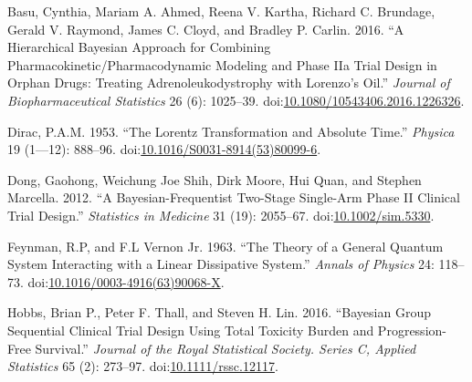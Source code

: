 \documentclass[]{elsarticle} %
\begin{document}
\hypertarget{ref-basu_hierarchical_2016}{}
Basu, Cynthia, Mariam A. Ahmed, Reena V. Kartha, Richard C. Brundage,
Gerald V. Raymond, James C. Cloyd, and Bradley P. Carlin. 2016. ``A
Hierarchical Bayesian Approach for Combining
Pharmacokinetic/Pharmacodynamic Modeling and Phase IIa Trial Design in
Orphan Drugs: Treating Adrenoleukodystrophy with Lorenzo's Oil.''
\emph{Journal of Biopharmaceutical Statistics} 26 (6): 1025--39.
doi:\href{https://doi.org/10.1080/10543406.2016.1226326}{10.1080/10543406.2016.1226326}.

\hypertarget{ref-Dirac1953888}{}
Dirac, P.A.M. 1953. ``The Lorentz Transformation and Absolute Time.''
\emph{Physica} 19 (1---12): 888--96.
doi:\href{https://doi.org/10.1016/S0031-8914(53)80099-6}{10.1016/S0031-8914(53)80099-6}.

\hypertarget{ref-dong_bayesian-frequentist_2012}{}
Dong, Gaohong, Weichung Joe Shih, Dirk Moore, Hui Quan, and Stephen
Marcella. 2012. ``A Bayesian-Frequentist Two-Stage Single-Arm Phase II
Clinical Trial Design.'' \emph{Statistics in Medicine} 31 (19):
2055--67. doi:\href{https://doi.org/10.1002/sim.5330}{10.1002/sim.5330}.

\hypertarget{ref-Feynman1963118}{}
Feynman, R.P, and F.L Vernon Jr. 1963. ``The Theory of a General Quantum
System Interacting with a Linear Dissipative System.'' \emph{Annals of
Physics} 24: 118--73.
doi:\href{https://doi.org/10.1016/0003-4916(63)90068-X}{10.1016/0003-4916(63)90068-X}.

\hypertarget{ref-hobbs_bayesian_2016}{}
Hobbs, Brian P., Peter F. Thall, and Steven H. Lin. 2016. ``Bayesian
Group Sequential Clinical Trial Design Using Total Toxicity Burden and
Progression-Free Survival.'' \emph{Journal of the Royal Statistical
Society. Series C, Applied Statistics} 65 (2): 273--97.
doi:\href{https://doi.org/10.1111/rssc.12117}{10.1111/rssc.12117}.
\end{document}
